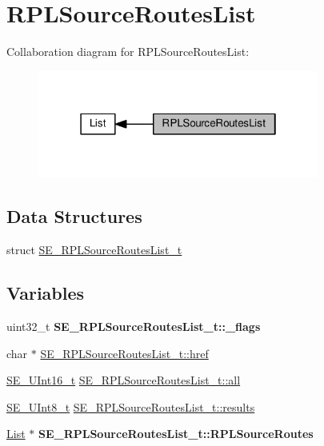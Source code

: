 \hypertarget{group__RPLSourceRoutesList}{}\section{R\+P\+L\+Source\+Routes\+List}
\label{group__RPLSourceRoutesList}
Collaboration diagram for R\+P\+L\+Source\+Routes\+List\+:\nopagebreak
\begin{figure}[H]
\begin{center}
\leavevmode
\includegraphics[width=262pt]{group__RPLSourceRoutesList}
\end{center}
\end{figure}
\subsection*{Data Structures}
\begin{DoxyCompactItemize}
\item 
struct \hyperlink{structSE__RPLSourceRoutesList__t}{S\+E\+\_\+\+R\+P\+L\+Source\+Routes\+List\+\_\+t}
\end{DoxyCompactItemize}
\subsection*{Variables}
\begin{DoxyCompactItemize}
\item 
\mbox{\label{group__RPLSourceRoutesList_gaebc8397835291ba3ae04730aabf75b36}} 
uint32\+\_\+t {\bfseries S\+E\+\_\+\+R\+P\+L\+Source\+Routes\+List\+\_\+t\+::\+\_\+flags}
\item 
char $\ast$ \hyperlink{group__RPLSourceRoutesList_gaf65b4ffd48968f3035c0e40b241a43f4}{S\+E\+\_\+\+R\+P\+L\+Source\+Routes\+List\+\_\+t\+::href}
\item 
\hyperlink{group__UInt16_gac68d541f189538bfd30cfaa712d20d29}{S\+E\+\_\+\+U\+Int16\+\_\+t} \hyperlink{group__RPLSourceRoutesList_ga04c0efe18f093f5ff2a5e67a613c54f7}{S\+E\+\_\+\+R\+P\+L\+Source\+Routes\+List\+\_\+t\+::all}
\item 
\hyperlink{group__UInt8_gaf7c365a1acfe204e3a67c16ed44572f5}{S\+E\+\_\+\+U\+Int8\+\_\+t} \hyperlink{group__RPLSourceRoutesList_ga1c13d6ce2b9941d34c0562011bae9012}{S\+E\+\_\+\+R\+P\+L\+Source\+Routes\+List\+\_\+t\+::results}
\item 
\mbox{\label{group__RPLSourceRoutesList_gab4ffe596af7b247ce6b15d6f209ce5a6}} 
\hyperlink{structList}{List} $\ast$ {\bfseries S\+E\+\_\+\+R\+P\+L\+Source\+Routes\+List\+\_\+t\+::\+R\+P\+L\+Source\+Routes}
\end{DoxyCompactItemize}


